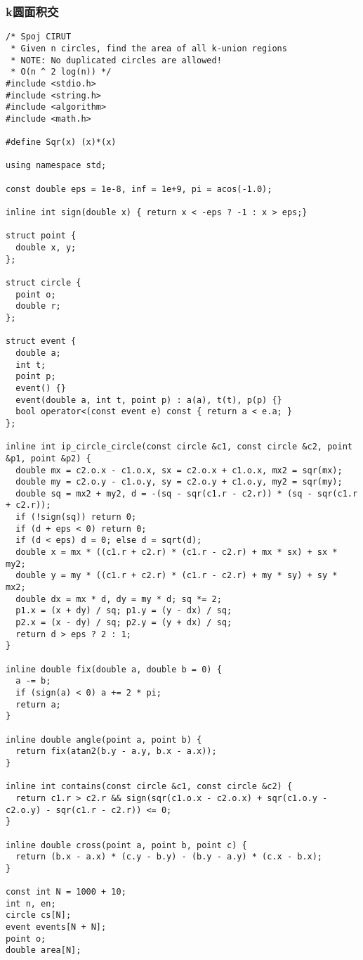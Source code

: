 \subsubsection{k圆面积交}
\begin{verbatim}
/* Spoj CIRUT
 * Given n circles, find the area of all k-union regions
 * NOTE: No duplicated circles are allowed!
 * O(n ^ 2 log(n)) */
#include <stdio.h>
#include <string.h>
#include <algorithm>
#include <math.h>

#define Sqr(x) (x)*(x)

using namespace std;

const double eps = 1e-8, inf = 1e+9, pi = acos(-1.0);

inline int sign(double x) { return x < -eps ? -1 : x > eps;}

struct point {
  double x, y;
};

struct circle {
  point o;
  double r;
};

struct event {
  double a;
  int t;
  point p;
  event() {}
  event(double a, int t, point p) : a(a), t(t), p(p) {}
  bool operator<(const event e) const { return a < e.a; }
};

inline int ip_circle_circle(const circle &c1, const circle &c2, point &p1, point &p2) {
  double mx = c2.o.x - c1.o.x, sx = c2.o.x + c1.o.x, mx2 = sqr(mx);
  double my = c2.o.y - c1.o.y, sy = c2.o.y + c1.o.y, my2 = sqr(my);
  double sq = mx2 + my2, d = -(sq - sqr(c1.r - c2.r)) * (sq - sqr(c1.r + c2.r));
  if (!sign(sq)) return 0;
  if (d + eps < 0) return 0;
  if (d < eps) d = 0; else d = sqrt(d);
  double x = mx * ((c1.r + c2.r) * (c1.r - c2.r) + mx * sx) + sx * my2;
  double y = my * ((c1.r + c2.r) * (c1.r - c2.r) + my * sy) + sy * mx2;
  double dx = mx * d, dy = my * d; sq *= 2;
  p1.x = (x + dy) / sq; p1.y = (y - dx) / sq;
  p2.x = (x - dy) / sq; p2.y = (y + dx) / sq;
  return d > eps ? 2 : 1;
}

inline double fix(double a, double b = 0) {
  a -= b;
  if (sign(a) < 0) a += 2 * pi;
  return a;
}

inline double angle(point a, point b) {
  return fix(atan2(b.y - a.y, b.x - a.x));
}

inline int contains(const circle &c1, const circle &c2) {
  return c1.r > c2.r && sign(sqr(c1.o.x - c2.o.x) + sqr(c1.o.y - c2.o.y) - sqr(c1.r - c2.r)) <= 0;
}

inline double cross(point a, point b, point c) {
  return (b.x - a.x) * (c.y - b.y) - (b.y - a.y) * (c.x - b.x);
}

const int N = 1000 + 10;
int n, en;
circle cs[N];
event events[N + N];
point o;
double area[N];


\end{verbatim}
